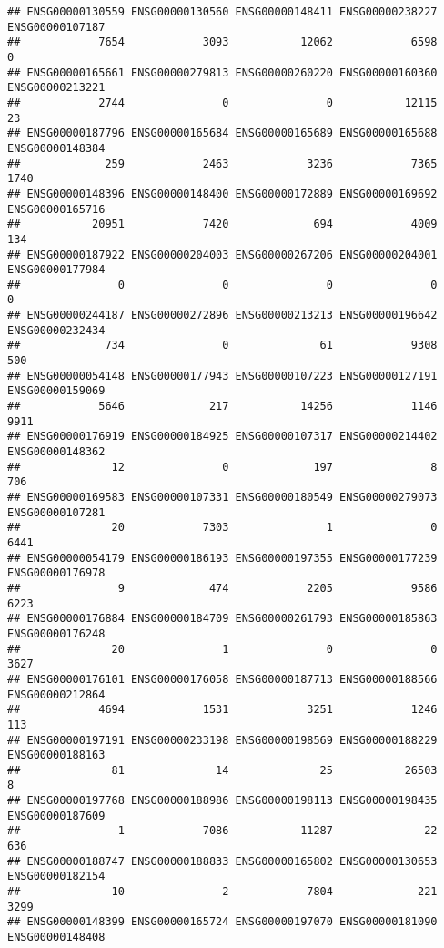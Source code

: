 \documentclass[
]{article}
\begin{document}
\begin{verbatim}
## ENSG00000130559 ENSG00000130560 ENSG00000148411 ENSG00000238227 ENSG00000107187 
##            7654            3093           12062            6598               0 
## ENSG00000165661 ENSG00000279813 ENSG00000260220 ENSG00000160360 ENSG00000213221 
##            2744               0               0           12115              23 
## ENSG00000187796 ENSG00000165684 ENSG00000165689 ENSG00000165688 ENSG00000148384 
##             259            2463            3236            7365            1740 
## ENSG00000148396 ENSG00000148400 ENSG00000172889 ENSG00000169692 ENSG00000165716 
##           20951            7420             694            4009             134 
## ENSG00000187922 ENSG00000204003 ENSG00000267206 ENSG00000204001 ENSG00000177984 
##               0               0               0               0               0 
## ENSG00000244187 ENSG00000272896 ENSG00000213213 ENSG00000196642 ENSG00000232434 
##             734               0              61            9308             500 
## ENSG00000054148 ENSG00000177943 ENSG00000107223 ENSG00000127191 ENSG00000159069 
##            5646             217           14256            1146            9911 
## ENSG00000176919 ENSG00000184925 ENSG00000107317 ENSG00000214402 ENSG00000148362 
##              12               0             197               8             706 
## ENSG00000169583 ENSG00000107331 ENSG00000180549 ENSG00000279073 ENSG00000107281 
##              20            7303               1               0            6441 
## ENSG00000054179 ENSG00000186193 ENSG00000197355 ENSG00000177239 ENSG00000176978 
##               9             474            2205            9586            6223 
## ENSG00000176884 ENSG00000184709 ENSG00000261793 ENSG00000185863 ENSG00000176248 
##              20               1               0               0            3627 
## ENSG00000176101 ENSG00000176058 ENSG00000187713 ENSG00000188566 ENSG00000212864 
##            4694            1531            3251            1246             113 
## ENSG00000197191 ENSG00000233198 ENSG00000198569 ENSG00000188229 ENSG00000188163 
##              81              14              25           26503               8 
## ENSG00000197768 ENSG00000188986 ENSG00000198113 ENSG00000198435 ENSG00000187609 
##               1            7086           11287              22             636 
## ENSG00000188747 ENSG00000188833 ENSG00000165802 ENSG00000130653 ENSG00000182154 
##              10               2            7804             221            3299 
## ENSG00000148399 ENSG00000165724 ENSG00000197070 ENSG00000181090 ENSG00000148408 

\end{verbatim}
\end{document}
